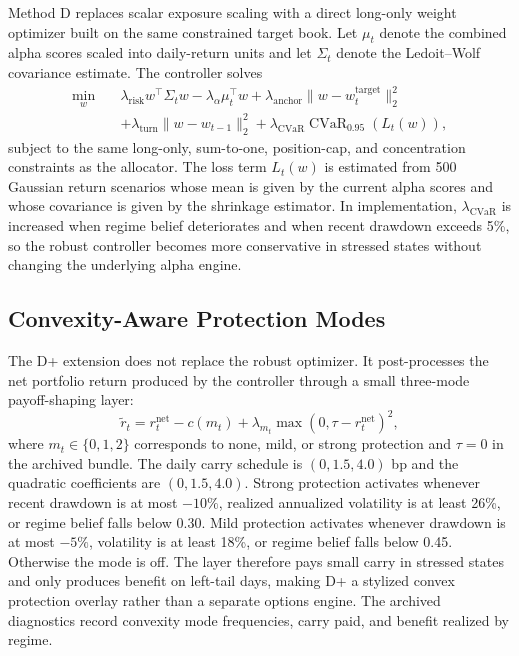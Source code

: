 \documentclass[10pt,twocolumn]{article}
\begin{document}
Method D replaces scalar exposure scaling with a direct long-only weight
optimizer built on the same constrained target book. Let $\mu_t$ denote the
combined alpha scores scaled into daily-return units and let $\Sigma_t$ denote
the Ledoit--Wolf covariance estimate. The controller solves
\begin{align*}
\min_w \quad &
\lambda_{\mathrm{risk}} w^\top \Sigma_t w
- \lambda_{\alpha}\mu_t^\top w
+ \lambda_{\mathrm{anchor}}\lVert w-w_t^{\mathrm{target}} \rVert_2^2
\\
&+ \lambda_{\mathrm{turn}}\lVert w-w_{t-1} \rVert_2^2
+ \lambda_{\mathrm{CVaR}} \operatorname{CVaR}_{0.95}(L_t(w)),
\end{align*}
subject to the same long-only, sum-to-one, position-cap, and concentration
constraints as the allocator. The loss term $L_t(w)$ is estimated from 500
Gaussian return scenarios whose mean is given by the current alpha scores and
whose covariance is given by the shrinkage estimator. In implementation,
$\lambda_{\mathrm{CVaR}}$ is increased when regime belief deteriorates and when
recent drawdown exceeds 5\%, so the robust controller becomes more conservative
in stressed states without changing the underlying alpha engine.

\subsection{Convexity-Aware Protection Modes}

The D+ extension does not replace the robust optimizer. It post-processes the
net portfolio return produced by the controller through a small three-mode
payoff-shaping layer:
\[
\tilde r_t = r_t^{\mathrm{net}} - c(m_t)
+ \lambda_{m_t}\max(0,\tau-r_t^{\mathrm{net}})^2,
\]
where $m_t \in \{0,1,2\}$ corresponds to none, mild, or strong protection and
$\tau=0$ in the archived bundle. The daily carry schedule is $(0,1.5,4.0)$ bp
and the quadratic coefficients are $(0,1.5,4.0)$. Strong protection activates
whenever recent drawdown is at most $-10\%$, realized annualized volatility is
at least 26\%, or regime belief falls below 0.30. Mild protection activates
whenever drawdown is at most $-5\%$, volatility is at least 18\%, or regime
belief falls below 0.45. Otherwise the mode is off. The layer therefore pays
small carry in stressed states and only produces benefit on left-tail days,
making D+ a stylized convex protection overlay rather than a separate options
engine. The archived diagnostics record convexity mode frequencies, carry paid,
and benefit realized by regime.
\end{document}
